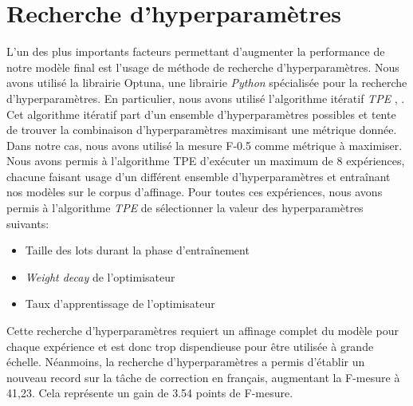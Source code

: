 \documentclass[12pt,twoside,rapport]{dms}
\theoremstyle{definition}
\numberwithin{equation}{section}
\numberwithin{table}{chapter}
\numberwithin{figure}{chapter}
\begin{document}
\section{Recherche d'hyperparamètres}
L'un des plus importants facteurs permettant d'augmenter la performance de notre
modèle final est l'usage de méthode de recherche d'hyperparamètres. Nous avons
utilisé la librairie Optuna, une librairie \textit{Python} spécialisée pour la
recherche d'hyperparamètres. En particulier, nous avons utilisé l'algorithme
itératif \textit{TPE}
\cite{watanabe2023treestructuredparzenestimatorunderstanding},
\cite{NIPS2011_86e8f7ab}. Cet algorithme itératif part d'un ensemble
d'hyperparamètres possibles et tente de trouver la combinaison
d'hyperparamètres maximisant une métrique donnée. Dans notre cas, nous avons
utilisé la mesure F-0.5 comme métrique à maximiser. Nous avons permis à
l'algorithme TPE d'exécuter un maximum de 8 expériences, chacune faisant usage
d'un différent ensemble d'hyperparamètres et entraînant nos modèles sur le
corpus d'affinage. Pour toutes ces expériences, nous avons permis à
l'algorithme \textit{TPE} de sélectionner la valeur des hyperparamètres
suivants:
\begin{itemize}
	\item Taille des lots durant la phase d'entraînement
	\item \textit{Weight decay} de l'optimisateur
	\item Taux d'apprentissage de l'optimisateur
\end{itemize}
Cette recherche d'hyperparamètres requiert un affinage complet du modèle pour
chaque expérience et est donc trop dispendieuse pour être utilisée à grande
échelle. Néanmoins, la recherche d'hyperparamètres a permis d'établir un
nouveau record sur la tâche de correction en français, augmentant la F-mesure à
41,23. Cela représente un gain de 3.54 points de F-mesure.
\end{document}
